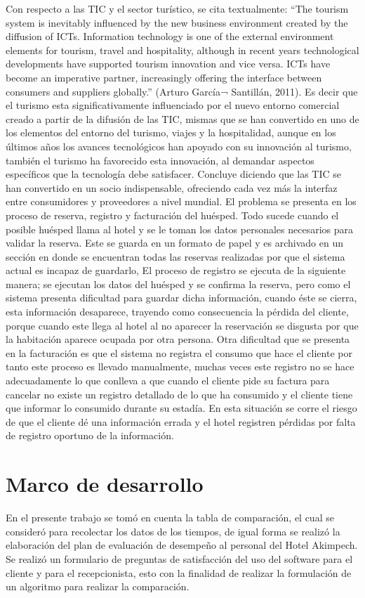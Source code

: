 \documentclass{comjnl}
\begin{document}
Con respecto a las TIC y el sector turístico, se cita textualmente: “The tourism system is inevitably influenced by the new business environment created by the diffusion of ICTs. Information technology is one of the external environment elements for tourism, travel and hospitality, although in recent years technological developments have supported tourism innovation and vice versa. ICTs have become an imperative partner, increasingly offering the interface between consumers and suppliers globally.” (Arturo García¬ Santillán, 2011). Es decir que el turismo esta significativamente influenciado por el nuevo entorno comercial creado a partir de la difusión de las TIC, mismas que se han convertido en uno de los elementos del entorno del turismo, viajes y la hospitalidad, aunque en los últimos años los avances tecnológicos han apoyado con su innovación al turismo, también el turismo ha favorecido esta innovación, al demandar aspectos específicos que la tecnología debe satisfacer. Concluye diciendo que las TIC se han convertido en un socio indispensable, ofreciendo cada vez más la interfaz entre consumidores y proveedores a nivel mundial.
El problema se presenta en los proceso de reserva, registro y facturación del huésped. Todo sucede cuando el posible huésped llama al hotel y se le toman los datos personales necesarios para validar la reserva. Este se guarda en un formato de papel y es archivado en un sección en donde se encuentran todas las reservas realizadas por que el sistema actual es incapaz de guardarlo, El
proceso de registro se ejecuta de la siguiente manera; se ejecutan los datos del huésped y se confirma la reserva, pero como el sistema presenta dificultad para guardar dicha información, cuando éste se cierra, esta información desaparece, trayendo como consecuencia la pérdida del cliente, porque cuando este llega al hotel al no aparecer la reservación se disgusta por que la habitación aparece ocupada por otra persona. 
Otra dificultad que se presenta en la facturación es que el sistema no registra el consumo que hace el cliente por tanto este proceso es llevado manualmente, muchas veces este registro no se hace adecuadamente lo que conlleva a que cuando el cliente pide su factura para cancelar no existe un registro detallado de lo que ha consumido y el cliente tiene que informar lo consumido durante su estadía. En esta situación se corre el riesgo de que el cliente dé una información errada y el hotel registren pérdidas por falta de registro oportuno de la información.


\section{Marco de desarrollo} \label{Model}
En el presente trabajo se tomó en cuenta la tabla de comparación, el cual se consideró para recolectar los datos de los tiempos, de igual forma se realizó la elaboración del plan de evaluación de desempeño al personal del Hotel Akimpech. 
Se realizó un formulario de preguntas de satisfacción del uso del software para el cliente y para el recepcionista, esto con la finalidad de realizar la formulación de un algoritmo para realizar la comparación.
\end{document}
